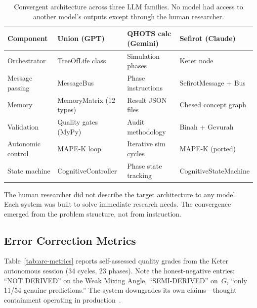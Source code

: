 \documentclass[11pt]{article}
\theoremstyle{definition}
\theoremstyle{remark}
\begin{document}
\begin{table}[ht]
\centering
\caption{Convergent architecture across three LLM families.  No model had access
  to another model's outputs except through the human researcher.}
\label{tab:convergence}
\begin{tabular}{@{}llll@{}}
\toprule
\textbf{Component} & \textbf{Union (GPT)} & \textbf{QHOTS calc (Gemini)}
  & \textbf{Sefirot (Claude)} \\
\midrule
Orchestrator     & TreeOfLife class      & Simulation phases     & Keter node \\
Message passing  & MessageBus            & Phase instructions    & SefirotMessage + Bus \\
Memory           & MemoryMatrix (12 types) & Result JSON files   & Chesed concept graph \\
Validation       & Quality gates (MyPy)  & Audit methodology     & Binah + Gevurah \\
Autonomic control & MAPE-K loop          & Iterative sim cycles  & MAPE-K (ported) \\
State machine    & CognitiveController   & Phase state tracking  & CognitiveStateMachine \\
\bottomrule
\end{tabular}
\end{table}

The human researcher did not describe the target architecture to any model.
Each system was built to solve immediate research needs.  The convergence emerged
from the problem structure, not from instruction.

\subsection{Error Correction Metrics}
\label{sec:error-correction-metrics}

Table~\ref{tab:arc-metrics} reports self-assessed quality grades from the Keter
autonomous session (34 cycles, 23 phases).  Note the honest-negative entries:
``NOT DERIVED'' on the Weak Mixing Angle, ``SEMI-DERIVED'' on~$G$, ``only 11/54
genuine predictions.''  The system downgrades its own claims---thought
containment operating in production~\cite{kadavath2022llm}.
\end{document}
